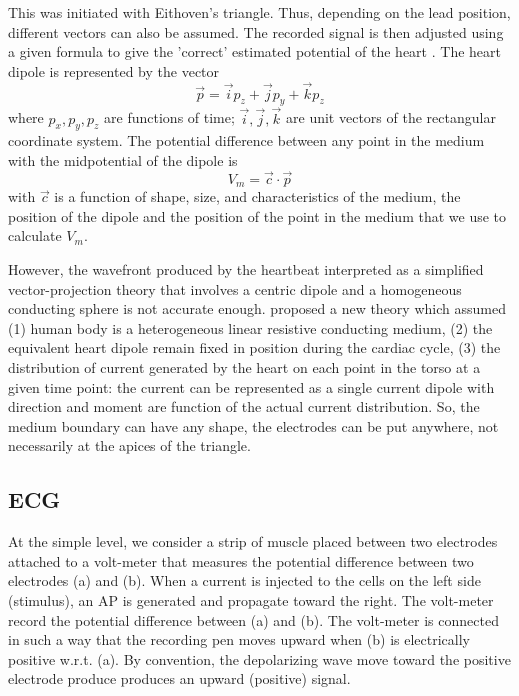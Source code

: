 This was initiated with Eithoven's triangle.
Thus, depending on the lead position, different vectors can also be assumed. The
recorded signal is then adjusted using a given formula to give the 'correct'
estimated potential of the heart \citep{mcfee1950}. 
The heart dipole is represented by the vector
\begin{equation}
\vec{p} = \vec{i} p_z + \vec{j} p_y + \vec{k} p_z
\end{equation}
where $p_x,p_y,p_z$ are functions of time; $\vec{i},\vec{j},\vec{k}$ are unit
vectors of the rectangular coordinate system. The potential difference between
any point in the medium with the midpotential of the dipole is
\begin{equation}
V_m = \vec{c}\cdot \vec{p} 
\end{equation}
with $\vec{c}$ is a function of shape, size, and characteristics of the medium,
the position of the dipole and the position of the point in the medium that we
use to calculate $V_m$.

However, the wavefront produced by the heartbeat interpreted as a simplified
vector-projection theory that involves a centric dipole and a homogeneous
conducting sphere is not accurate enough. \citep{frank1954} proposed a new
theory which assumed (1) human body is a heterogeneous linear resistive
conducting medium, (2) the equivalent heart dipole remain fixed in position
during the cardiac cycle, (3) the distribution of current generated by the heart
on each point in the torso at a given time point: the current can be represented
as a single current dipole with direction and moment are function of the actual
current distribution. So, the medium boundary can have any shape, the electrodes
can be put anywhere, not necessarily at the apices of the triangle.


\subsection{ECG}

At the simple level, we consider a strip of muscle placed between two electrodes
attached to a volt-meter that measures the potential difference between two
electrodes (a) and (b). When a current is injected to the cells on the left side
(stimulus), an AP is generated and propagate toward the right. The volt-meter
record the potential difference between (a) and (b). The volt-meter is connected
in such a way that the recording pen moves upward when (b) is electrically
positive w.r.t. (a). By convention, the depolarizing wave move toward the
positive electrode produce produces an upward (positive) signal. 

